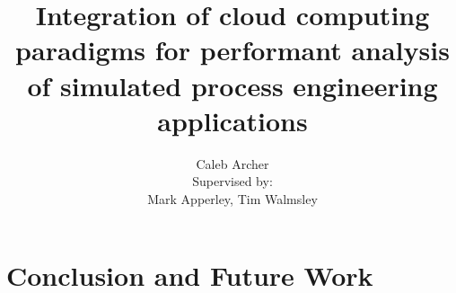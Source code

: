\documentclass[12pt,a4paper]{uwthesis17}
\title{Integration of cloud computing paradigms for performant analysis of simulated process engineering applications}
\author{
  Caleb Archer \\
  Supervised by: \\
  Mark Apperley, Tim Walmsley
}
\begin{document}

\maketitle

\setcounter{page}{2}

\begin{abstract}

\end{abstract}

\begin{acknowledgements}

\end{acknowledgements}

\begin{authorship-declaration}

\end{authorship-declaration}

\tableofcontents

\listoffigures

\listoftables

\newpage

\setcounter{page}{1}







\chapter{Conclusion and Future Work}

\printbibliography
\end{document}
